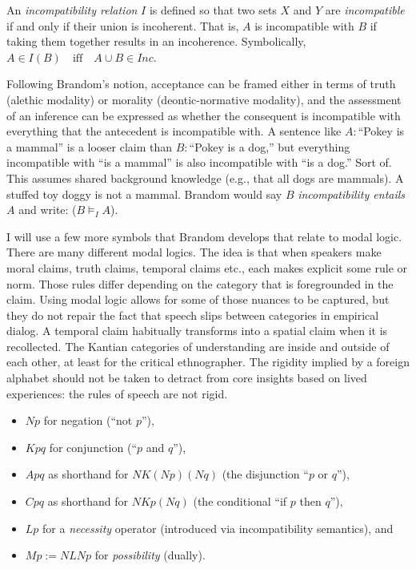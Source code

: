\documentclass[12pt]{book}
\begin{document}
An \textit{incompatibility relation} $I$ is defined so that two sets $X$ and $Y$ are \textit{incompatible} if and only if their union is incoherent. That is, $A$ is incompatible with $B$ if taking them together results in an incoherence. Symbolically, $A \in I(B) \quad \text{iff} \quad A \cup B \in Inc.$



Following Brandom's notion, acceptance can be framed either in terms of truth (alethic modality) or morality (deontic-normative modality), and the assessment of an inference can be expressed as whether the consequent is incompatible with everything that the antecedent is incompatible with. A sentence like $A:$``Pokey is a mammal'' is a looser claim than $B:$``Pokey is a dog,'' but everything incompatible with ``is a mammal'' is also incompatible with ``is a dog.'' Sort of. This assumes shared background knowledge (e.g., that all dogs are mammals). A stuffed toy doggy is not a mammal. Brandom would say $B$ \textit{incompatibility entails} $A$ and write: ($B \models_I A$). 

I will use a few more symbols that Brandom develops that relate to modal logic. There are many different modal logics. The idea is that when speakers make moral claims, truth claims, temporal claims etc., each makes explicit some rule or norm. Those rules differ depending on the category that is foregrounded in the claim. Using modal logic allows for some of those nuances to be captured, but they do not repair the fact that speech slips between categories in empirical dialog. A temporal claim habitually transforms into a spatial claim when it is recollected. The Kantian categories of understanding are inside and outside of each other, at least for the critical ethnographer. The rigidity implied by a foreign alphabet should not be taken to detract from core insights based on lived experiences: the rules of speech are not rigid.



\begin{itemize}
 \item $N p$ for negation (``not $p$''),
 \item $Kpq$ for conjunction (``$p$ and $q$''),
 \item $A p q$ as shorthand for $N K (N p)(N q)$ (the disjunction ``$p$ or $q$''),
 \item $C p q$ as shorthand for $N K p (N q)$ (the conditional ``if $p$ then $q$''),
 \item $L p$ for a \textit{necessity} operator (introduced via incompatibility semantics), and 
 \item $M p := N L N p$ for \textit{possibility} (dually).
\end{itemize}
\end{document}
